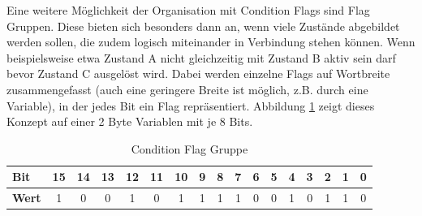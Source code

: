 \documentclass{llncs}
\begin{document}
Eine weitere Möglichkeit der Organisation mit Condition Flags sind Flag Gruppen. Diese bieten sich besonders dann an, wenn viele Zustände abgebildet werden sollen, die zudem logisch miteinander in Verbindung stehen können. Wenn beispielsweise etwa Zustand A nicht gleichzeitig mit Zustand B aktiv sein darf bevor Zustand C ausgelöst wird. Dabei werden einzelne Flags auf Wortbreite zusammengefasst (auch eine geringere Breite ist möglich, z.B. durch eine Variable), in der jedes Bit ein Flag repräsentiert. Abbildung \ref{tab:FlagGroup} zeigt dieses Konzept auf einer 2 Byte Variablen mit je 8 Bits.\\
\begin{table}[h]
	\centering %
	\def\arraystretch{1.5} %
	\setlength{\tabcolsep}{0.5em} %
		\begin{tabular}[h]{|l|c|c|c|c|c|c|c|c|c|c|c|c|c|c|c|c|}
			\hline
			\textbf{Bit} & \cellcolor{hellgrau}15 & \cellcolor{hellgrau}14 & \cellcolor{hellgrau}13 & \cellcolor{hellgrau}12 & \cellcolor{hellgrau}11 & \cellcolor{hellgrau}10 & \cellcolor{hellgrau}9 & \cellcolor{hellgrau}8 & \cellcolor{hellgrau}7 & \cellcolor{hellgrau}6 & \cellcolor{hellgrau}5 & \cellcolor{hellgrau}4 & \cellcolor{hellgrau}3 & \cellcolor{hellgrau}2 & \cellcolor{hellgrau}1 & \cellcolor{hellgrau}0 \\
			\hline
			\textbf{Wert} & 1 & 0 & 0 & 1 & 0 & 1 & 1 & 1 & 1 & 0 & 0 & 1 & 0 & 1 & 1 & 0 \\
			\hline
	\end{tabular}%
	\caption{\label{tab:FlagGroup} Condition Flag Gruppe \autocite[vgl.][85]{Cooling2017}}
\end{table}
\end{document}
